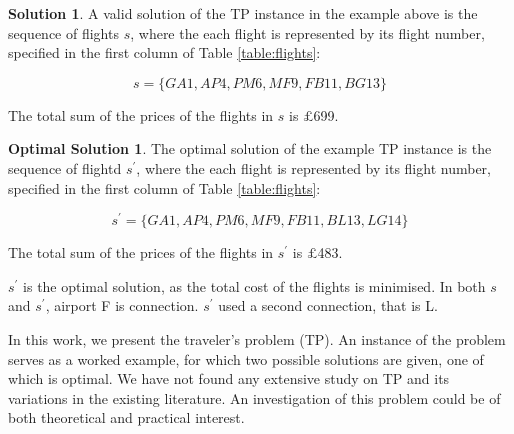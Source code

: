 \documentclass{article}
\theoremstyle{definition}
\newtheorem*{solution}{Solution}
\newtheorem*{osolution}{Optimal Solution}
\begin{document}
\begin{solution}
A valid solution of the TP instance in the example above is the sequence of flights $s$, where the each flight is represented by its flight number, specified in the first column of Table \ref{table:flights}:

$$ s = \{GA1, AP4, PM6, MF9, FB11, BG13\} $$

The total sum of the prices of the flights in $s$ is $\pounds$699.

\end{solution}

\begin{osolution}
The optimal solution of the example TP instance is the sequence of flightd $s^{\prime}$, where the each flight is represented by its flight number, specified in the first column of Table \ref{table:flights}:

$$ s^{\prime} = \{GA1, AP4, PM6, MF9, FB11, BL13, LG14\} $$

The total sum of the prices of the flights in $s^{\prime}$ is $\pounds$483.

$s^{\prime}$ is the optimal solution, as the total cost of the flights is minimised. In both $s$ and $s^{\prime}$, airport F is connection. $s^{\prime}$ used a second connection, that is L.
\end{osolution}

In this work, we present the traveler's problem (TP). An instance of the problem serves as a worked example, for which two possible solutions are given, one of which is optimal. We have not found any extensive study on TP and its variations in the existing literature. An investigation of this problem could be of both theoretical and practical interest.
\end{document}
